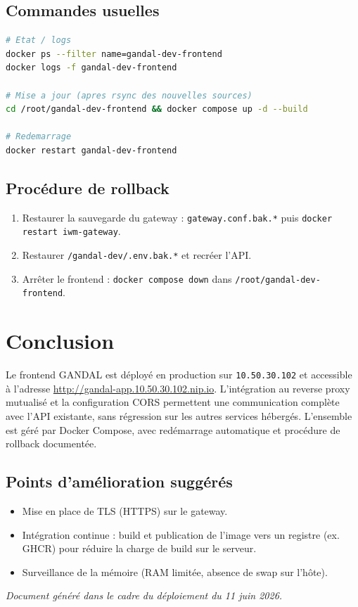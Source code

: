 \documentclass[11pt,a4paper]{article}
\begin{document}
\subsection{Commandes usuelles}
\begin{lstlisting}[language=bash]
# Etat / logs
docker ps --filter name=gandal-dev-frontend
docker logs -f gandal-dev-frontend

# Mise a jour (apres rsync des nouvelles sources)
cd /root/gandal-dev-frontend && docker compose up -d --build

# Redemarrage
docker restart gandal-dev-frontend
\end{lstlisting}

\subsection{Procédure de rollback}
\begin{enumerate}[leftmargin=1.6em]
  \item Restaurer la sauvegarde du gateway : \texttt{gateway.conf.bak.*} puis
        \texttt{docker restart iwm-gateway}.
  \item Restaurer \texttt{/gandal-dev/.env.bak.*} et recréer l'API.
  \item Arrêter le frontend : \texttt{docker compose down} dans
        \texttt{/root/gandal-dev-frontend}.
\end{enumerate}

\section{Conclusion}

Le frontend GANDAL est déployé en production sur \texttt{10.50.30.102} et accessible
à l'adresse \url{http://gandal-app.10.50.30.102.nip.io}. L'intégration au reverse
proxy mutualisé et la configuration CORS permettent une communication complète avec
l'API existante, sans régression sur les autres services hébergés. L'ensemble est
géré par Docker Compose, avec redémarrage automatique et procédure de rollback
documentée.

\subsection*{Points d'amélioration suggérés}
\begin{itemize}[leftmargin=1.4em]
  \item Mise en place de TLS (HTTPS) sur le gateway.
  \item Intégration continue : build et publication de l'image vers un registre
        (ex. GHCR) pour réduire la charge de build sur le serveur.
  \item Surveillance de la mémoire (RAM limitée, absence de swap sur l'hôte).
\end{itemize}

\vfill
\begin{center}
\small\itshape Document généré dans le cadre du déploiement du 11 juin 2026.
\end{center}
\end{document}
